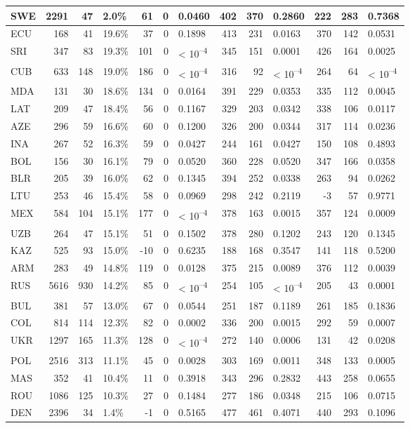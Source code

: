 \begin{tabular}{l|r|r|l|r|r|l|r|r|l|r|r|l}
\hline
SWE & 2291 & 47 & 2.0\% & 61 & 0 & 0.0460 & 402 & 370 & 0.2860 & 222 & 283 & 0.7368\\
\hline
ECU & 168 & 41 & 19.6\% & 37 & 0 & 0.1898 & 413 & 231 & 0.0163 & 370 & 142 & 0.0531\\
\hline
SRI & 347 & 83 & 19.3\% & 101 & 0 & < 10\textsuperscript{--4} & 345 & 151 & 0.0001 & 426 & 164 & 0.0025\\
\hline
CUB & 633 & 148 & 19.0\% & 186 & 0 & < 10\textsuperscript{--4} & 316 & 92 & < 10\textsuperscript{--4} & 264 & 64 & < 10\textsuperscript{--4}\\
\hline
MDA & 131 & 30 & 18.6\% & 134 & 0 & 0.0164 & 391 & 229 & 0.0353 & 335 & 112 & 0.0045\\
\hline
LAT & 209 & 47 & 18.4\% & 56 & 0 & 0.1167 & 329 & 203 & 0.0342 & 338 & 106 & 0.0117\\
\hline
AZE & 296 & 59 & 16.6\% & 60 & 0 & 0.1200 & 326 & 200 & 0.0344 & 317 & 114 & 0.0236\\
\hline
INA & 267 & 52 & 16.3\% & 59 & 0 & 0.0427 & 244 & 161 & 0.0427 & 150 & 108 & 0.4893\\
\hline
BOL & 156 & 30 & 16.1\% & 79 & 0 & 0.0520 & 360 & 228 & 0.0520 & 347 & 166 & 0.0358\\
\hline
BLR & 205 & 39 & 16.0\% & 62 & 0 & 0.1345 & 394 & 252 & 0.0338 & 263 & 94 & 0.0262\\
\hline
LTU & 253 & 46 & 15.4\% & 58 & 0 & 0.0969 & 298 & 242 & 0.2119 & -3 & 57 & 0.9771\\
\hline
MEX & 584 & 104 & 15.1\% & 177 & 0 & < 10\textsuperscript{--4} & 378 & 163 & 0.0015 & 357 & 124 & 0.0009\\
\hline
UZB & 264 & 47 & 15.1\% & 51 & 0 & 0.1502 & 378 & 280 & 0.1202 & 243 & 120 & 0.1345\\
\hline
KAZ & 525 & 93 & 15.0\% & -10 & 0 & 0.6235 & 188 & 168 & 0.3547 & 141 & 118 & 0.5200\\
\hline
ARM & 283 & 49 & 14.8\% & 119 & 0 & 0.0128 & 375 & 215 & 0.0089 & 376 & 112 & 0.0039\\
\hline
RUS & 5616 & 930 & 14.2\% & 85 & 0 & < 10\textsuperscript{--4} & 254 & 105 & < 10\textsuperscript{--4} & 205 & 43 & 0.0001\\
\hline
BUL & 381 & 57 & 13.0\% & 67 & 0 & 0.0544 & 251 & 187 & 0.1189 & 261 & 185 & 0.1836\\
\hline
COL & 814 & 114 & 12.3\% & 82 & 0 & 0.0002 & 336 & 200 & 0.0015 & 292 & 59 & 0.0007\\
\hline
UKR & 1297 & 165 & 11.3\% & 128 & 0 & < 10\textsuperscript{--4} & 272 & 140 & 0.0006 & 131 & 42 & 0.0208\\
\hline
POL & 2516 & 313 & 11.1\% & 45 & 0 & 0.0028 & 303 & 169 & 0.0011 & 348 & 133 & 0.0005\\
\hline
MAS & 352 & 41 & 10.4\% & 11 & 0 & 0.3918 & 343 & 296 & 0.2832 & 443 & 258 & 0.0655\\
\hline
ROU & 1086 & 125 & 10.3\% & 27 & 0 & 0.1484 & 277 & 186 & 0.0348 & 215 & 106 & 0.0715\\
\hline
DEN & 2396 & 34 & 1.4\% & -1 & 0 & 0.5165 & 477 & 461 & 0.4071 & 440 & 293 & 0.1096\\
\hline
\end{tabular}
